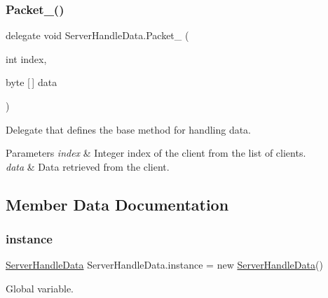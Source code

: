 \mbox{\label{class_server_handle_data_ae901e6592461e1e8403b0161e4a6c6a6}} 
\subsubsection{\texorpdfstring{Packet\_()}{Packet\_()}}
{\footnotesize\ttfamily delegate void Server\+Handle\+Data.\+Packet\+\_\+ (\begin{DoxyParamCaption}\item[{int}]{index,  }\item[{byte \mbox{[}$\,$\mbox{]}}]{data }\end{DoxyParamCaption})\hspace{0.3cm}{\ttfamily [private]}}



Delegate that defines the base method for handling data. 


\begin{DoxyParams}{Parameters}
{\em index} & Integer index of the client from the list of clients.\\
\hline
{\em data} & Data retrieved from the client.\\
\hline
\end{DoxyParams}


\subsection{Member Data Documentation}
\mbox{\label{class_server_handle_data_a53d7acb38385f73c248f5d3e3168f4d1}} 
\subsubsection{\texorpdfstring{instance}{instance}}
{\footnotesize\ttfamily \mbox{\hyperlink{class_server_handle_data}{Server\+Handle\+Data}} Server\+Handle\+Data.\+instance = new \mbox{\hyperlink{class_server_handle_data}{Server\+Handle\+Data}}()\hspace{0.3cm}{\ttfamily [static]}}



Global variable. 

\mbox{\label{class_server_handle_data_a072f1064e1d192b4001b1aaf2bfc3059}} 
